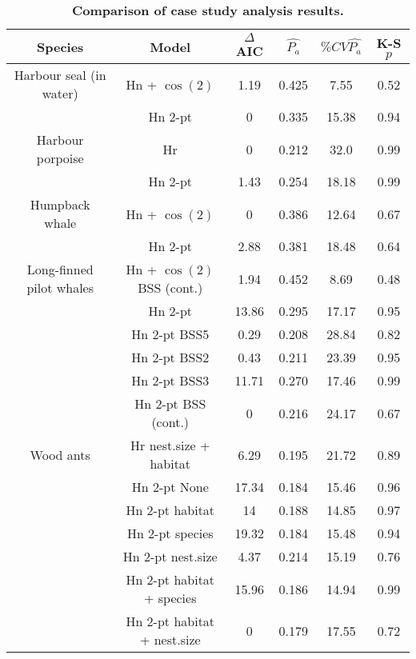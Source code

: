 \documentclass[10pt]{article}
\begin{document}
\begin{table}[!ht]
\caption{
{\bf Comparison of case study analysis results.}}
\centering
\begin{tabular}{| c | c | c | c | c | c |}
\hline
{\bf Species} & {\bf Model} & {\bf $\Delta$AIC} & $\hat{P_a}$ & {\bf $\% CV \hat{P_a}$} & {\bf K-S $p$}\\
\hline
Harbour seal (in water) & Hn + $\cos(2)$ & 1.19 & 0.425 & 7.55 & 0.52\\
\hline
 & Hn 2-pt  & 0 & 0.335 & 15.38 & 0.94\\
\hline
Harbour porpoise& Hr  & 0 & 0.212 & 32.0 & 0.99\\
\hline
 & Hn 2-pt & 1.43 & 0.254 & 18.18 & 0.99\\
\hline
Humpback whale & Hn + $\cos(2)$ & 0 & 0.386 & 12.64 & 0.67 \\
\hline
 & Hn 2-pt & 2.88 & 0.381 & 18.48 & 0.64 \\
\hline
Long-finned pilot whales  & Hn + $\cos(2)$ BSS (cont.) & 1.94 & 0.452 & 8.69 & 0.48\\ %
\hline
& Hn 2-pt          &  13.86  &  0.295  &  17.17  &  0.95 \\
\hline
 & Hn 2-pt BSS5         &  0.29   &  0.208  &  28.84  &  0.82 \\
 \hline
 & Hn 2-pt  BSS2        &  0.43  &  0.211  &  23.39  &  0.95 \\
 \hline
 & Hn 2-pt  BSS3        &  11.71 &  0.270  &  17.46  &  0.99 \\
 \hline
 & Hn 2-pt  BSS (cont.) & 0  &  0.216  &  24.17  &  0.67 \\
 \hline
Wood ants & Hr nest.size + habitat & 6.29 & 0.195  & 21.72 & 0.89\\ %
\hline
 & Hn 2-pt  None                                                     &  17.34 &  0.184  &  15.46  &  0.96 \\
 \hline
 & Hn 2-pt habitat                                          &  14     &  0.188  &  14.85  &  0.97 \\
 \hline
 & Hn 2-pt species                                          &  19.32  &  0.184  &  15.48  &  0.94 \\
 \hline
 & Hn 2-pt nest.size                                        &  4.37   &  0.214  &  15.19  &  0.76 \\
 \hline
 & Hn 2-pt habitat + species                       &  15.96  &  0.186  &  14.94  &  0.99 \\
 \hline
 & Hn 2-pt habitat + nest.size                     &  0      &  0.179  &  17.55  &  0.72 \\

\end{tabular}
\end{table}
\end{document}
